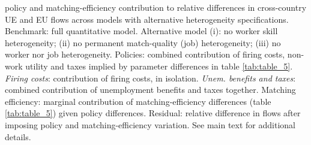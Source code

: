 \begin{table}[!h]
{{policy and matching-efficiency contribution to relative differences in cross-country UE and EU flows across models with alternative heterogeneity specifications. 
Benchmark: full quantitative model. Alternative model (i): no worker skill heterogeneity; (ii) no permanent match-quality (job) heterogeneity;
(iii) no worker nor job heterogeneity. Policies: combined contribution of firing costs, non-work utility and taxes implied by parameter differences in table \ref{tab:table_5}.
\textit{Firing costs}: contribution of firing costs, in isolation. \textit{Unem. benefits and taxes}: combined contribution of unemployment benefits and taxes together.
Matching efficiency: marginal contribution of matching-efficiency differences (table \ref{tab:table_5}) given policy differences. Residual: relative difference in flows after imposing policy and matching-efficiency variation. See main text for additional details.}}
\end{table}